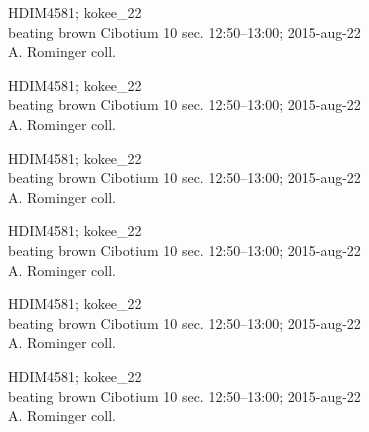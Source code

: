 \documentclass[2pt]{extarticle}
\begin{document}
\noindent
\parbox{0.16\textwidth}{\tiny \raggedright \rule[-0.3\baselineskip]{0pt}{10pt}HDIM4581; kokee\_22\\ beating brown Cibotium 10 sec. 12:50--13:00; 2015-aug-22\\ A. Rominger coll.}
\parbox{0.16\textwidth}{\tiny \raggedright \rule[-0.3\baselineskip]{0pt}{10pt}HDIM4581; kokee\_22\\ beating brown Cibotium 10 sec. 12:50--13:00; 2015-aug-22\\ A. Rominger coll.}
\parbox{0.16\textwidth}{\tiny \raggedright \rule[-0.3\baselineskip]{0pt}{10pt}HDIM4581; kokee\_22\\ beating brown Cibotium 10 sec. 12:50--13:00; 2015-aug-22\\ A. Rominger coll.}
\parbox{0.16\textwidth}{\tiny \raggedright \rule[-0.3\baselineskip]{0pt}{10pt}HDIM4581; kokee\_22\\ beating brown Cibotium 10 sec. 12:50--13:00; 2015-aug-22\\ A. Rominger coll.}
\parbox{0.16\textwidth}{\tiny \raggedright \rule[-0.3\baselineskip]{0pt}{10pt}HDIM4581; kokee\_22\\ beating brown Cibotium 10 sec. 12:50--13:00; 2015-aug-22\\ A. Rominger coll.}
\parbox{0.16\textwidth}{\tiny \raggedright \rule[-0.3\baselineskip]{0pt}{10pt}HDIM4581; kokee\_22\\ beating brown Cibotium 10 sec. 12:50--13:00; 2015-aug-22\\ A. Rominger coll.} \\ 
\vspace{0.001in} 
\end{document}
